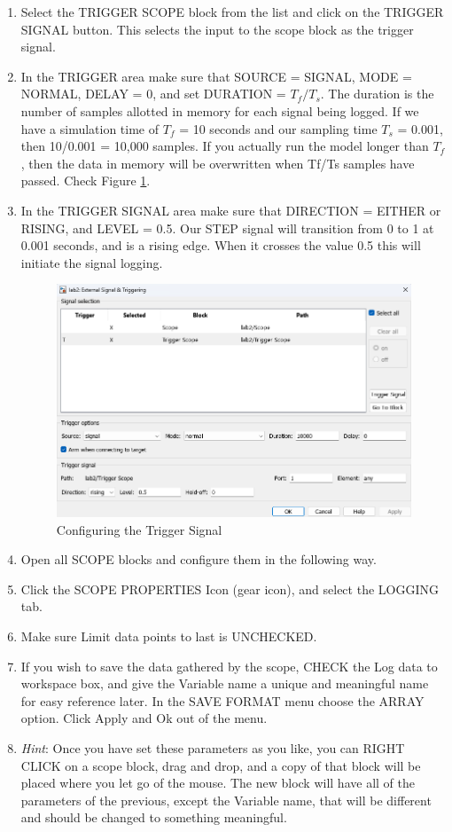 \documentclass[11pt,letterpaper]{article}
\begin{document}
\begin{enumerate}
  \item Select the TRIGGER SCOPE block from the list and click on the TRIGGER SIGNAL button. This selects the input to the scope block as the trigger signal. 
  
  \item In the TRIGGER area make sure that SOURCE = SIGNAL, MODE = NORMAL, DELAY = 0, and set DURATION = $T_f/T_s$. The duration is the number of samples allotted in memory for each signal being logged. If we have a simulation time of $T_f$ = 10 seconds and our sampling time $T_s$ = 0.001, then 10/0.001 = 10,000 samples. If you actually run the model longer than $T_f$, then the data in memory will be overwritten when Tf/Ts samples have passed. Check Figure \ref{fig:trigger_config}.
  
  \item In the TRIGGER SIGNAL area make sure that DIRECTION = EITHER or RISING, and LEVEL = 0.5. Our STEP signal will transition from 0 to 1 at 0.001 seconds, and is a rising edge. When it crosses the value 0.5 this will initiate the signal logging.
  \begin{figure}[H]
    \centering 
    \includegraphics[width=.8\textwidth]{Figures/fig8_signals_and_triggering.png}
    \caption{Configuring the Trigger Signal}
    \label{fig:trigger_config}
  \end{figure}
  \item Open all SCOPE blocks and configure them in the following way. 
  
  \item Click the SCOPE PROPERTIES Icon (gear icon), and select the LOGGING tab. 
  
  \item Make sure Limit data points to last is UNCHECKED.
  
  \item If you wish to save the data gathered by the scope, CHECK the Log data to workspace box, and give the Variable name a unique and meaningful name for easy reference later. In the SAVE FORMAT menu choose the ARRAY option. Click Apply and Ok out of the menu.
  
  \item \textit{Hint}: Once you have set these parameters as you like, you can RIGHT CLICK on a scope block, drag and drop, and a copy of that block will be placed where you let go of the mouse. The new block will have all of the parameters of the previous, except the Variable name, that will be different and should be changed to something meaningful. 
\end{enumerate}
\end{document}
